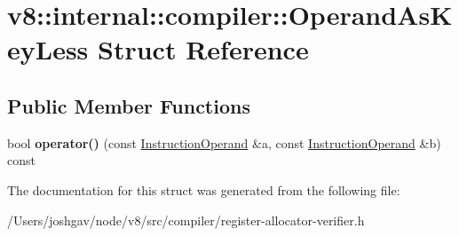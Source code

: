 \hypertarget{structv8_1_1internal_1_1compiler_1_1_operand_as_key_less}{}\section{v8\+:\+:internal\+:\+:compiler\+:\+:Operand\+As\+Key\+Less Struct Reference}
\label{structv8_1_1internal_1_1compiler_1_1_operand_as_key_less}
\subsection*{Public Member Functions}
\begin{DoxyCompactItemize}
\item 
bool {\bfseries operator()} (const \hyperlink{classv8_1_1internal_1_1compiler_1_1_instruction_operand}{Instruction\+Operand} \&a, const \hyperlink{classv8_1_1internal_1_1compiler_1_1_instruction_operand}{Instruction\+Operand} \&b) const \hypertarget{structv8_1_1internal_1_1compiler_1_1_operand_as_key_less_ad353d274206231510a88cb9c9f1e3cfc}{}\label{structv8_1_1internal_1_1compiler_1_1_operand_as_key_less_ad353d274206231510a88cb9c9f1e3cfc}

\end{DoxyCompactItemize}


The documentation for this struct was generated from the following file\+:\begin{DoxyCompactItemize}
\item 
/\+Users/joshgav/node/v8/src/compiler/register-\/allocator-\/verifier.\+h\end{DoxyCompactItemize}
